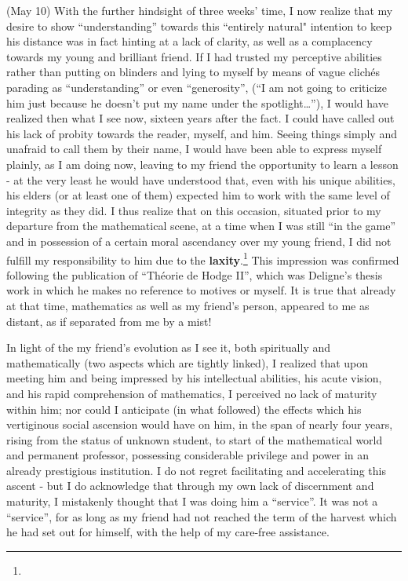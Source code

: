  (May 10) With the further hindsight of three weeks' time, I now realize 
that my desire to show ``understanding'' towards this ``entirely natural" intention to 
keep his distance was in fact hinting at a lack of clarity, as well as a complacency 
towards my young and brilliant friend. 
If I had trusted my perceptive abilities rather than putting on blinders and lying to
myself by means of vague clich\'es parading as ``understanding'' or even ``generosity'',
(``I am not going to criticize him just because he doesn't put my name under the
spotlight\ldots''), 
I would have realized then what I see now, sixteen years after the fact.  
I could have called out his lack of probity towards the reader, myself, and him. 
Seeing things simply and unafraid to call them by their 
name, I would have been able to
express myself plainly, as I am doing now, leaving to my friend the opportunity to learn a
lesson - at the very least he would have understood that, even with his unique abilities,
his elders  (or at least one of them) expected him to work with the same level of
integrity as they did.
I thus realize that on this occasion, situated prior to my departure from the mathematical
scene, at a time when I was still ``in the game'' and 
in possession of a certain moral ascendancy over my young friend, I did not fulfill my
responsibility to him due to the \textbf{laxity}.\footnote{}
This impression was confirmed following the publication of
``Th\'eorie de Hodge II'', which was Deligne's thesis work in which he makes no reference
to motives or myself. 
It is true that already at that time, mathematics as well as my friend's person, appeared
to me as distant, as if separated from me by a mist! 

In light of the my friend's evolution as I see it, both spiritually and mathematically
(two aspects which are tightly linked), I realized that upon meeting him and being
impressed by his intellectual abilities, his acute vision, and his rapid comprehension of
mathematics, I perceived no lack of maturity within him; nor could I anticipate (in what
followed) the effects which his vertiginous social ascension would have on him, in the
span of nearly four years, rising from the status of unknown student, to start of the
mathematical world and permanent professor, possessing considerable privilege and power in
an already prestigious institution. I do not regret facilitating and accelerating this
ascent - but I do acknowledge that through my own lack of discernment and maturity, I
mistakenly thought that I was doing him a ``service''.
It was not a ``service'', for as long as my friend had not reached the 
term of the harvest which he had set out for himself, with the help of my 
care-free assistance.



